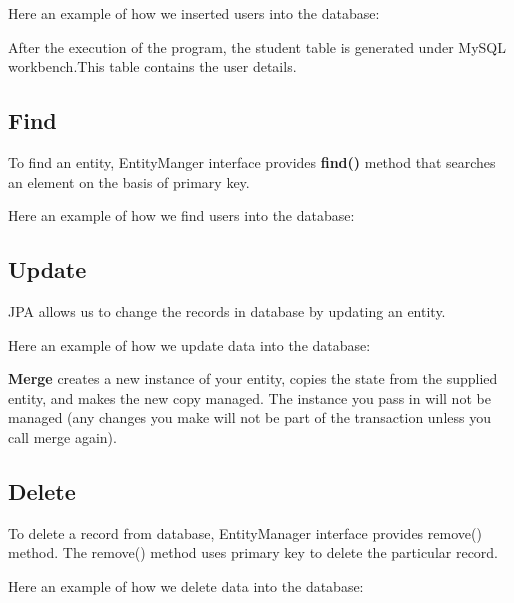 \documentclass[a4paper]{article}
\begin{document}
Here an example of how we inserted users into the database:

After the execution of the program, the student table is generated under MySQL workbench.This table contains the user details.

\subsection{Find}
To find an entity, EntityManger interface provides \textbf{find()} method that searches an element on the basis of primary key.

Here an example of how we find users into the database:


\subsection{Update}
JPA allows us to change the records in database by updating an entity.

Here an example of how we update data into the database:

\textbf{Merge} creates a new instance of your entity, copies the state from the supplied entity, and makes the new copy managed. The instance you pass in will not be managed (any changes you make will not be part of the transaction unless you call merge again).

\subsection{Delete}
To delete a record from database, EntityManager interface provides remove() method. The remove() method uses primary key to delete the particular record.

Here an example of how we delete data into the database:

\end{document}
